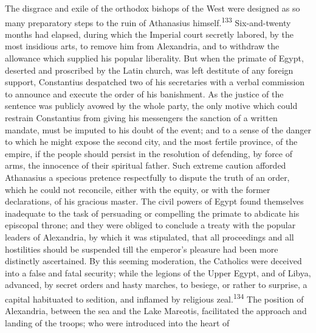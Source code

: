 

The disgrace and exile of the orthodox bishops of the West were
designed as so many preparatory steps to the ruin of Athanasius
himself.\textsuperscript{133} Six-and-twenty months had elapsed, during which the
Imperial court secretly labored, by the most insidious arts, to
remove him from Alexandria, and to withdraw the allowance which
supplied his popular liberality. But when the primate of Egypt,
deserted and proscribed by the Latin church, was left destitute
of any foreign support, Constantius despatched two of his
secretaries with a verbal commission to announce and execute the
order of his banishment. As the justice of the sentence was
publicly avowed by the whole party, the only motive which could
restrain Constantius from giving his messengers the sanction of a
written mandate, must be imputed to his doubt of the event; and
to a sense of the danger to which he might expose the second
city, and the most fertile province, of the empire, if the people
should persist in the resolution of defending, by force of arms,
the innocence of their spiritual father. Such extreme caution
afforded Athanasius a specious pretence respectfully to dispute
the truth of an order, which he could not reconcile, either with
the equity, or with the former declarations, of his gracious
master. The civil powers of Egypt found themselves inadequate to
the task of persuading or compelling the primate to abdicate his
episcopal throne; and they were obliged to conclude a treaty with
the popular leaders of Alexandria, by which it was stipulated,
that all proceedings and all hostilities should be suspended till
the emperor’s pleasure had been more distinctly ascertained. By
this seeming moderation, the Catholics were deceived into a false
and fatal security; while the legions of the Upper Egypt, and of
Libya, advanced, by secret orders and hasty marches, to besiege,
or rather to surprise, a capital habituated to sedition, and
inflamed by religious zeal.\textsuperscript{134} The position of Alexandria,
between the sea and the Lake Mareotis, facilitated the approach
and landing of the troops; who were introduced into the heart of
